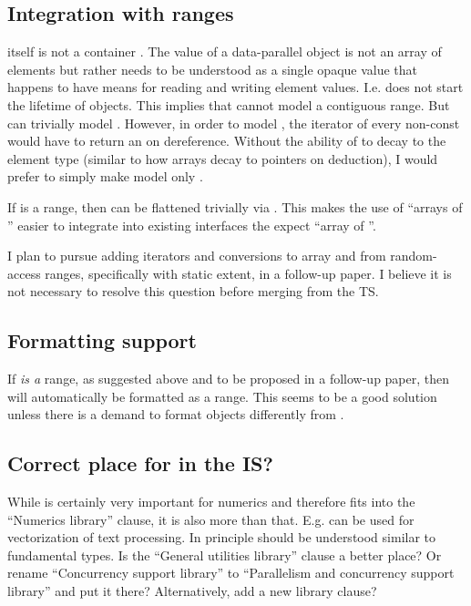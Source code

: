 \subsection{Integration with ranges}\label{sec:ranges}
 itself is not a container \cite{P0851R0}.
The value of a data-parallel object is not an array of elements but rather needs to be understood as a single opaque value that happens to have means for reading and writing element values.
I.e.  does not start the lifetime of  objects.
This implies that  cannot model a contiguous range.
But  can trivially model .
However, in order to model , the iterator of every non-const
 would have to return an  on dereference.
Without the ability of  to decay to the element type
(similar to how arrays decay to pointers on deduction), I would prefer to
simply make  model only .

If  is a range, then  can
be flattened trivially via .
This makes the use of ``arrays of '' easier to integrate into
existing interfaces the expect ``array of ''.

I plan to pursue adding iterators and conversions to array and from
random-access ranges, specifically  with static extent, in a
follow-up paper.
I believe it is not necessary to resolve this question before merging
 from the TS.

\subsection{Formatting support}\label{sec:formatting}
If  \emph{is a} range, as suggested above and to be proposed in a
follow-up paper, then  will automatically be formatted as a range.
This seems to be a good solution unless there is a demand to format 
objects differently from .

\subsection{Correct place for  in the IS?}

While  is certainly very important for numerics and therefore fits into the “Numerics library” clause, it is also more than that.
E.g.  can be used for vectorization of text processing.
In principle  should be understood similar to fundamental types.
Is the “General utilities library” clause a better place?
Or rename “Concurrency support library” to “Parallelism and concurrency support library” and put it there?
Alternatively, add a new library clause?

